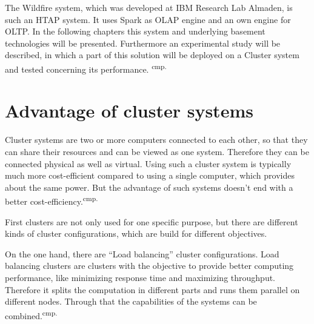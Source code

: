 The Wildfire system, which was developed at IBM Research Lab Almaden, is such an HTAP system. It uses Spark as OLAP engine and an own engine for OLTP. In the following chapters this system and underlying basement technologies will be presented. Furthermore an experimental study will be described, in which a part of this solution will be deployed on a Cluster system and tested concerning its performance. \textsuperscript{cmp.\cite{7}}


\section{Advantage of cluster systems}

Cluster systems are two or more computers connected to each other, so that they can share their resources and can be viewed as one system. Therefore they can be connected physical as well as virtual. Using such a cluster system is typically much more cost-efficient compared to using a single computer, which provides about the same power. But the advantage of such systems doesn't end with a better cost-efficiency.\textsuperscript{cmp.\cite{1}}


First clusters are not only used for one specific purpose, but there are different kinds of cluster configurations, which are build for different objectives.

On the one hand, there are ``Load balancing'' cluster configurations. Load balancing clusters are clusters with the objective to provide better computing performance, like minimizing response time and maximizing throughput.  Therefore it splits the computation in different parts and runs them parallel on different nodes. Through that the capabilities of the systems can be combined.\textsuperscript{cmp.\cite{2}}


